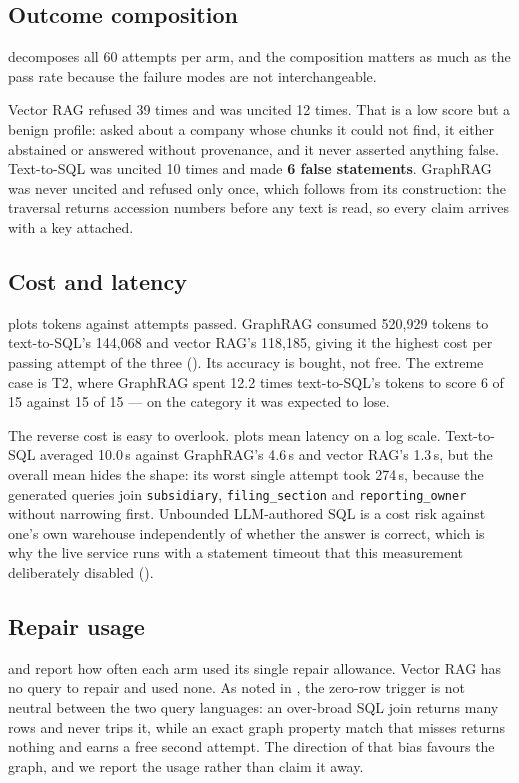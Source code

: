 \subsection{Outcome composition}

 decomposes all 60 attempts per arm, and the composition
matters as much as the pass rate because the failure modes are not
interchangeable.

Vector RAG refused 39 times and was uncited 12 times. That is a low score but a
benign profile: asked about a company whose chunks it could not find, it either
abstained or answered without provenance, and it never asserted anything false.
Text-to-SQL was uncited 10 times and made \textbf{6 false statements}. GraphRAG
was never uncited and refused only once, which follows from its construction: the
traversal returns accession numbers before any text is read, so every claim
arrives with a key attached.

\subsection{Cost and latency}

 plots tokens against attempts passed. GraphRAG consumed 520{,}929
tokens to text-to-SQL's 144{,}068 and vector RAG's 118{,}185, giving it the
highest cost per passing attempt of the three (). Its accuracy is
bought, not free. The extreme case is T2, where GraphRAG spent 12.2 times
text-to-SQL's tokens to score 6 of 15 against 15 of 15 --- on the category it was
expected to lose.

The reverse cost is easy to overlook.  plots mean latency on a
log scale. Text-to-SQL averaged 10.0\,s against GraphRAG's 4.6\,s and vector
RAG's 1.3\,s, but the overall mean hides the shape: its worst single attempt took
274\,s, because the generated queries join \texttt{subsidiary},
\texttt{filing\_section} and \texttt{reporting\_owner} without narrowing first.
Unbounded LLM-authored SQL is a cost risk against one's own warehouse
independently of whether the answer is correct, which is why the live service
runs with a statement timeout that this measurement deliberately disabled
().

\subsection{Repair usage}

 and  report how often each arm used its single
repair allowance. Vector RAG has no query to repair and used none. As noted in
, the zero-row trigger is not neutral between the two query
languages: an over-broad SQL join returns many rows and never trips it, while an
exact graph property match that misses returns nothing and earns a free second
attempt. The direction of that bias favours the graph, and we report the usage
rather than claim it away.
